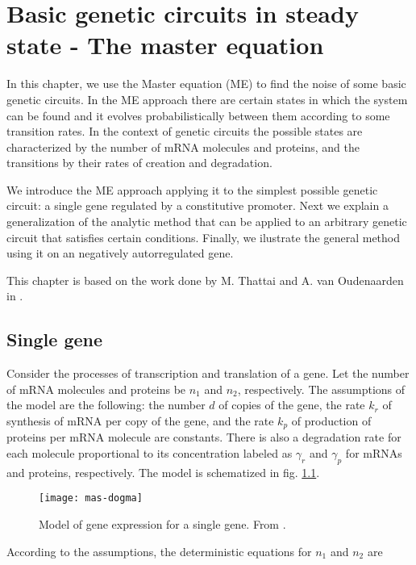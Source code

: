 \chapter{Basic genetic circuits in steady state - The master equation}
\label{ch:master}

In this chapter, we use the Master equation (ME) to find the noise of some basic genetic circuits. In the ME approach there are certain states in which the system can be found and it evolves probabilistically between them according to some transition rates. In the context of genetic circuits the possible states are characterized by the number of mRNA molecules and proteins, and the transitions by their rates of creation and degradation.

We introduce the ME approach applying it to the simplest possible genetic circuit: a single gene regulated by a constitutive promoter. Next we explain a generalization of the analytic method that can be applied to an arbitrary genetic circuit that satisfies certain conditions. Finally, we ilustrate the general method using it on an negatively autorregulated gene.

This chapter is based on the work done by M. Thattai and A. van Oudenaarden in \cite{thattai01}.

\section{Single gene}
\label{sec:mas-single_gene}
Consider the processes of transcription and translation of a gene. Let the number of mRNA molecules and proteins be $n_1$ and $n_2$, respectively. The assumptions of the model are the following: the number $d$ of copies of the gene, the rate $k_r$ of synthesis of mRNA per copy of the gene, and the rate $k_p$ of production of proteins per mRNA molecule are constants. There is also a degradation rate for each molecule proportional to its concentration labeled as $\gamma_r$ and $\gamma_p$ for mRNAs and proteins, respectively. The model is schematized in fig. \ref{fig:mas-dogma}.

\begin{figure}[H]
  \centering
  \texttt{[image: mas-dogma]}
  \caption[Model of gene expression for a single gene]{\label{fig:mas-dogma} Model of gene expression for a single gene. From \cite{thattai01}.}
\end{figure}

According to the assumptions, the deterministic equations for $n_1$ and $n_2$ are

